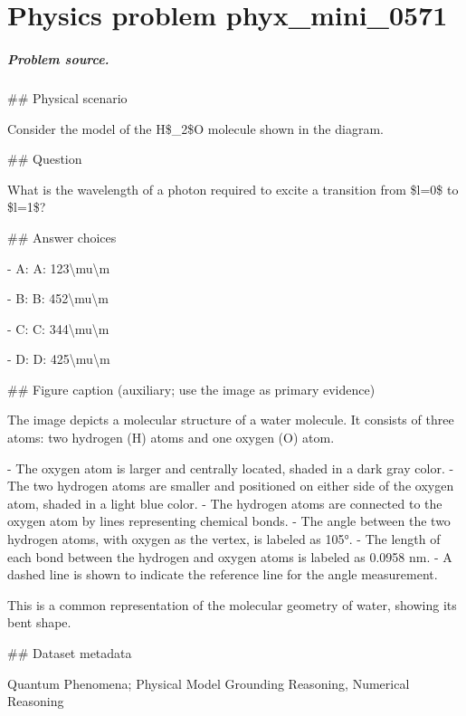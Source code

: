 
\chapter{Physics problem phyx\_mini\_0571}
\label{ch:PhyXMiniProblems_problem_phyx_mini_0571}

\paragraph{Problem source.}
\#\# Physical scenario

Consider the model of the H\$\_2\$O molecule shown in the diagram.

\#\# Question

What is the wavelength of a photon required to excite a transition from \$l=0\$ to \$l=1\$?

\#\# Answer choices

- A: A: 123\textbackslash{}mu\textbackslash{}m

- B: B: 452\textbackslash{}mu\textbackslash{}m

- C: C: 344\textbackslash{}mu\textbackslash{}m

- D: D: 425\textbackslash{}mu\textbackslash{}m

\#\# Figure caption (auxiliary; use the image as primary evidence)

The image depicts a molecular structure of a water molecule. It consists of three atoms: two hydrogen (H) atoms and one oxygen (O) atom. 

- The oxygen atom is larger and centrally located, shaded in a dark gray color.
- The two hydrogen atoms are smaller and positioned on either side of the oxygen atom, shaded in a light blue color.
- The hydrogen atoms are connected to the oxygen atom by lines representing chemical bonds.
- The angle between the two hydrogen atoms, with oxygen as the vertex, is labeled as 105°.
- The length of each bond between the hydrogen and oxygen atoms is labeled as 0.0958 nm.
- A dashed line is shown to indicate the reference line for the angle measurement.
  
This is a common representation of the molecular geometry of water, showing its bent shape.

\#\# Dataset metadata

Quantum Phenomena; Physical Model Grounding Reasoning, Numerical Reasoning

